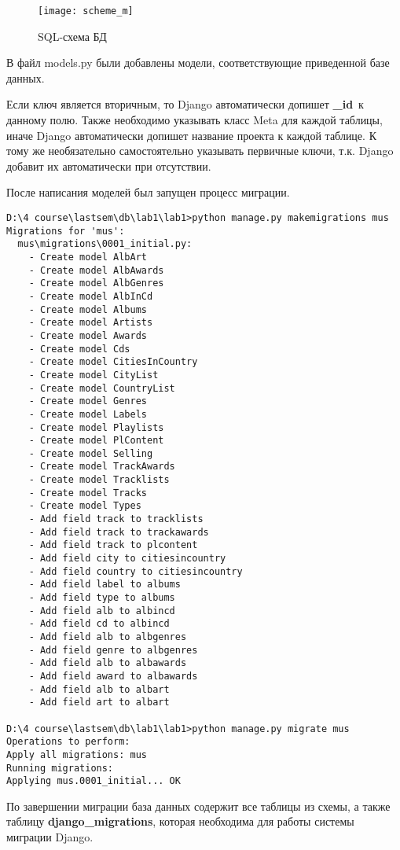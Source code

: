 \begin{figure}[H]
	\centering
	\texttt{[image: scheme\_m]}
	\caption{SQL-схема БД}
	\label{fig:db_scheme}
\end{figure}

В файл models.py были добавлены модели, соответствующие приведенной базе данных.



Если ключ является вторичным, то Django автоматически допишет \textbf{\_id} к данному полю. Также необходимо указывать класс Meta для каждой таблицы, иначе Django автоматически допишет название проекта к каждой таблице. К тому же необязательно самостоятельно указывать первичные ключи, т.к. Django добавит их автоматически при отсутствии.

После написания моделей был запущен процесс миграции.

\begin{lstlisting}[caption=Процесс миграция]
D:\4 course\lastsem\db\lab1\lab1>python manage.py makemigrations mus
Migrations for 'mus':
  mus\migrations\0001_initial.py:
    - Create model AlbArt
    - Create model AlbAwards
    - Create model AlbGenres
    - Create model AlbInCd
    - Create model Albums
    - Create model Artists
    - Create model Awards
    - Create model Cds
    - Create model CitiesInCountry
    - Create model CityList
    - Create model CountryList
    - Create model Genres
    - Create model Labels
    - Create model Playlists
    - Create model PlContent
    - Create model Selling
    - Create model TrackAwards
    - Create model Tracklists
    - Create model Tracks
    - Create model Types
    - Add field track to tracklists
    - Add field track to trackawards
    - Add field track to plcontent
    - Add field city to citiesincountry
    - Add field country to citiesincountry
    - Add field label to albums
    - Add field type to albums
    - Add field alb to albincd
    - Add field cd to albincd
    - Add field alb to albgenres
    - Add field genre to albgenres
    - Add field alb to albawards
    - Add field award to albawards
    - Add field alb to albart
    - Add field art to albart

D:\4 course\lastsem\db\lab1\lab1>python manage.py migrate mus
Operations to perform:
Apply all migrations: mus
Running migrations:
Applying mus.0001_initial... OK
\end{lstlisting}

По завершении миграции база данных содержит все таблицы из схемы, а также таблицу \textbf{django\_migrations}, которая необходима для работы системы миграции Django.

